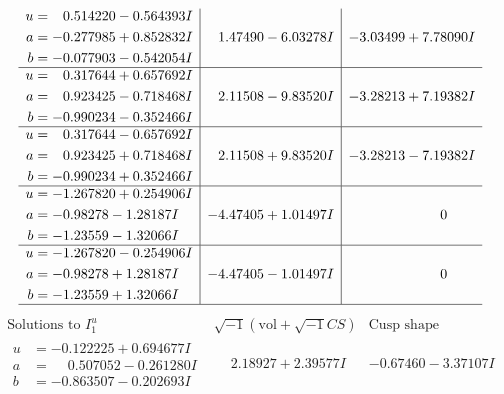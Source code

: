 \documentclass[1p]{elsarticle_modified}
\theoremstyle{definition}
\newcommand{\I}{\sqrt{-1}}
\begin{document}
$$\begin{array}{c|c|c}
\begin{aligned}
u &= \phantom{-}0.514220 - 0.564393 I \\
a &= -0.277985 + 0.852832 I \\
b &= -0.077903 - 0.542054 I\end{aligned}
 & \phantom{-}1.47490 - 6.03278 I & -3.03499 + 7.78090 I \\ \hline\begin{aligned}
u &= \phantom{-}0.317644 + 0.657692 I \\
a &= \phantom{-}0.923425 - 0.718468 I \\
b &= -0.990234 - 0.352466 I\end{aligned}
 & \phantom{-}2.11508 - 9.83520 I & -3.28213 + 7.19382 I \\ \hline\begin{aligned}
u &= \phantom{-}0.317644 - 0.657692 I \\
a &= \phantom{-}0.923425 + 0.718468 I \\
b &= -0.990234 + 0.352466 I\end{aligned}
 & \phantom{-}2.11508 + 9.83520 I & -3.28213 - 7.19382 I \\ \hline\begin{aligned}
u &= -1.267820 + 0.254906 I \\
a &= -0.98278 - 1.28187 I \\
b &= -1.23559 - 1.32066 I\end{aligned}
 & -4.47405 + 1.01497 I & \phantom{-0.000000 } 0 \\ \hline\begin{aligned}
u &= -1.267820 - 0.254906 I \\
a &= -0.98278 + 1.28187 I \\
b &= -1.23559 + 1.32066 I\end{aligned}
 & -4.47405 - 1.01497 I & \phantom{-0.000000 } 0\\
 \hline 
 \end{array}$$\newpage$$\begin{array}{c|c|c}  
\text{Solutions to }I^u_{1}& \I (\text{vol} + \sqrt{-1}CS) & \text{Cusp shape}\\
 \hline 
\begin{aligned}
u &= -0.122225 + 0.694677 I \\
a &= \phantom{-}0.507052 - 0.261280 I \\
b &= -0.863507 - 0.202693 I\end{aligned}
 & \phantom{-}2.18927 + 2.39577 I & -0.67460 - 3.37107 I \\ \hline\begin{aligned}

\end{aligned}
\end{array}$$
\end{document}
